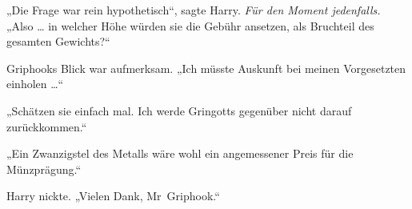 „Die Frage war rein hypothetisch“, sagte Harry. \emph{Für den Moment jedenfalls.}
„Also … in welcher Höhe würden sie die Gebühr ansetzen, als Bruchteil des gesamten Gewichts?“

Griphooks Blick war aufmerksam.
„Ich müsste Auskunft bei meinen Vorgesetzten einholen …“

„Schätzen sie einfach mal. Ich werde Gringotts gegenüber nicht darauf zurückkommen.“

„Ein Zwanzigstel des Metalls wäre wohl ein angemessener Preis für die Münzprägung.“

Harry nickte.
„Vielen Dank, Mr~Griphook.“

